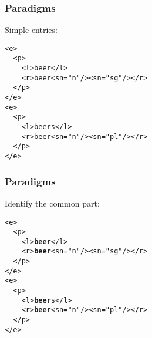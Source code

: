 \documentclass{beamer} %
\begin{document}
\begin{frame}
  \frametitle{Paradigms}

  \begin{exampleblock}{Simple entries:}
    \begin{footnotesize}
    \begin{alltt}
      <e> \\
      ~~<p> \\
      ~~~~<l>beer</l> \\
      ~~~~<r>beer<s n="n"/><s n="sg"/></r> \\
      ~~</p> \\
      </e> \\
      <e> \\
      ~~<p> \\
      ~~~~<l>beers</l> \\
      ~~~~<r>beer<s n="n"/><s n="pl"/></r> \\
      ~~</p> \\
      </e>
    \end{alltt}
    \end{footnotesize}
\end{exampleblock}

\end{frame}

\begin{frame}
  \frametitle{Paradigms}

  \begin{exampleblock}{Identify the common part:}
    \begin{footnotesize}
    \begin{alltt}
      <e> \\
      ~~<p> \\
      ~~~~<l>{\bf beer}</l> \\
      ~~~~<r>{\bf beer}<s n="n"/><s n="sg"/></r> \\
      ~~</p> \\
      </e> \\
      <e> \\
      ~~<p> \\
      ~~~~<l>{\bf beer}s</l> \\
      ~~~~<r>{\bf beer}<s n="n"/><s n="pl"/></r> \\
      ~~</p> \\
      </e>
    \end{alltt}
    \end{footnotesize}
\end{exampleblock}
\end{frame}
\end{document}
